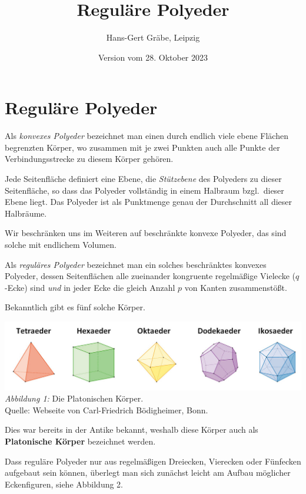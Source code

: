 \documentclass[11pt]{article}
\author{Hans-Gert Gräbe, Leipzig}
\title{Reguläre Polyeder\kosemnetlicensemark}
\date{Version vom 28. Oktober 2023}
\begin{document}
\maketitle

\section*{Reguläre Polyeder}

Als \emph{konvexes Polyeder} bezeichnet man einen durch endlich viele ebene
Flä\-chen begrenzten Körper, wo zusammen mit je zwei Punkten auch alle Punkte
der Verbindungsstrecke zu diesem Körper gehören.

Jede Seitenfläche definiert eine Ebene, die \emph{Stützebene} des Polyeders zu
dieser Seitenfläche, so dass das Polyeder vollständig in einem Halbraum
bzgl.\ dieser Ebene liegt. Das Polyeder ist als Punktmenge genau der
Durchschnitt all dieser Halbräume. 

Wir beschränken uns im Weiteren auf beschränkte konvexe Polyeder, das sind
solche mit endlichem Volumen. 

Als \emph{reguläres Polyeder} bezeichnet man ein solches beschränktes konvexes
Polyeder, dessen Seitenflächen alle zueinander kongruente regelmäßige Vielecke
($q$-Ecke) sind \emph{und} in jeder Ecke die gleich Anzahl $p$ von Kanten
zusammenstößt.

Bekanntlich gibt es fünf solche Körper.
\begin{center}
  \includegraphics[width=.8\textwidth]{graebe-05-1/PlatonischeKoerper.jpg}\\
  \emph{Abbildung 1:} Die Platonischen Körper.\\ Quelle: Webseite von
  Carl-Friedrich Bödigheimer, Bonn. 
\end{center}
Dies war bereits in der Antike bekannt, weshalb diese Körper auch als
\textbf{Platonische Körper} bezeichnet werden.  

Dass reguläre Polyeder nur aus regelmäßigen Dreiecken, Vierecken oder
Fünfecken aufgebaut sein können, überlegt man sich zunächst leicht am Aufbau
möglicher Eckenfiguren, siehe Abbildung 2.
\end{document}
